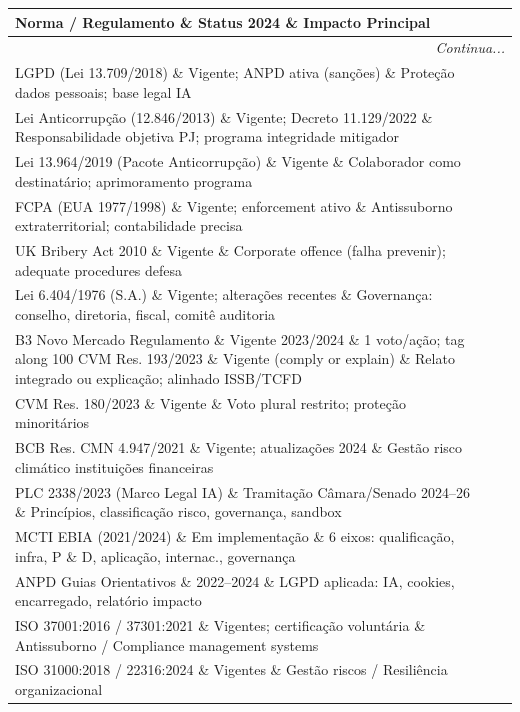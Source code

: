 \begin{longtable}{p{4cm}p{4cm}p{7cm}}
\toprule
\textbf{Norma / Regulamento} \& \textbf{Status 2024} \& \textbf{Impacto Principal}\\
\midrule
\endhead
\midrule
\multicolumn{3}{r}{\textit{Continua...}} \\
\endfoot
\bottomrule
\endlastfoot

LGPD (Lei 13.709/2018) \& Vigente; ANPD ativa (sanções) \& Proteção dados pessoais; base legal IA\\
Lei Anticorrupção (12.846/2013) \& Vigente; Decreto 11.129/2022 \& Responsabilidade objetiva PJ; programa integridade mitigador\\
Lei 13.964/2019 (Pacote Anticorrupção) \& Vigente \& Colaborador como destinatário; aprimoramento programa\\
FCPA (EUA 1977/1998) \& Vigente; enforcement ativo \& Antissuborno extraterritorial; contabilidade precisa\\
UK Bribery Act 2010 \& Vigente \& Corporate offence (falha prevenir); adequate procedures defesa\\
Lei 6.404/1976 (S.A.) \& Vigente; alterações recentes \& Governança: conselho, diretoria, fiscal, comitê auditoria\\
B3 Novo Mercado Regulamento \& Vigente 2023/2024 \& 1 voto/ação; tag along 100%
CVM Res. 193/2023 \& Vigente (comply or explain) \& Relato integrado ou explicação; alinhado ISSB/TCFD\\
CVM Res. 180/2023 \& Vigente \& Voto plural restrito; proteção minoritários\\
BCB Res. CMN 4.947/2021 \& Vigente; atualizações 2024 \& Gestão risco climático instituições financeiras\\
PLC 2338/2023 (Marco Legal IA) \& Tramitação Câmara/Senado 2024–26 \& Princípios, classificação risco, governança, sandbox\\
MCTI EBIA (2021/2024) \& Em implementação \& 6 eixos: qualificação, infra, P \& D, aplicação, internac., governança\\
ANPD Guias Orientativos \& 2022–2024 \& LGPD aplicada: IA, cookies, encarregado, relatório impacto\\
ISO 37001:2016 / 37301:2021 \& Vigentes; certificação voluntária \& Antissuborno / Compliance management systems\\
ISO 31000:2018 / 22316:2024 \& Vigentes \& Gestão riscos / Resiliência organizacional\\

\end{longtable}
